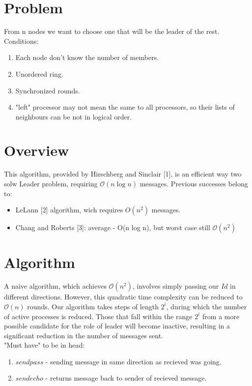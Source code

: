 \documentclass{article}
\begin{document}
\section*{Problem}
From n nodes we want to choose one that will be the leader of the rest. \\
Conditions:
\begin{enumerate}
    \item Each node don't know the number of members.
    \item Unordered ring.
    \item Synchronized rounds.
    \item "left" processor may not mean the same to all processors, so their lists of neighbours can be not in logical order.
\end{enumerate}

\section*{Overview}
This algorithm, provided by  Hirschberg and Sinclair [1], is an efficient way two solw Leader problem, requiring
\(\mathcal{O}(n \log n)\) messages.
Previous successes belong to:
\begin{itemize}
    \item LeLann [2] algorithm, wich requires $O(n^2)$ messages.
    \item Chang and Roberts [3]: average - O(n log n), but worst case still \(\mathcal{O}(n^2)\)
\end{itemize}


\section*{Algorithm}
A naive algorithm, which achieves
\(\mathcal{O}(n^2)\), involves simply passing our
$Id$ in different directions. However, this quadratic time complexity can be reduced to \(\mathcal{O}(n)\) rounds. Our algorithm takes steps of length
$2^i$, during which the number of active processes is reduced. Those that fall within the range $2^i$ from a more possible candidate for the role of leader will become inactive, resulting in a significant reduction in the number of messages sent.\\
"Must have" to be in head:
\begin{enumerate}
    \item \(sendpass\) - sending message in same direction as recieved was going.
    \item \(sendecho\) - returns message back to sender of recieved message.
\end{enumerate}
\end{document}
